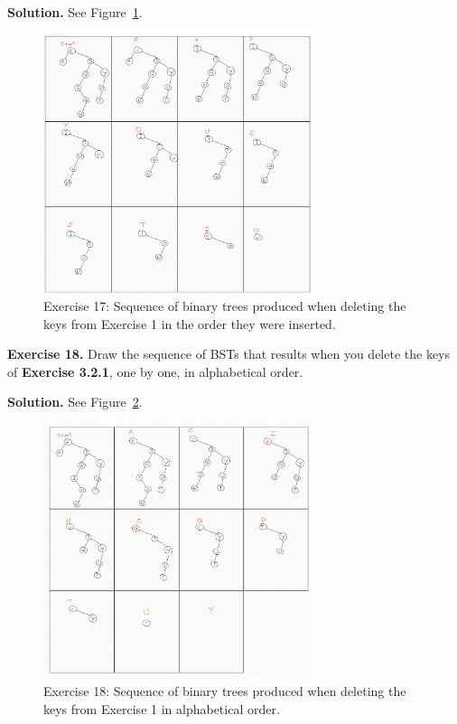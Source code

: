 \documentclass[12pt, a4paper]{article}
\newenvironment{ex}[2][Exercise]
{\par\medskip\noindent \textbf{#1 #2.}}
{\medskip}
\newenvironment{sol}[1][Solution]
{\par\medskip\noindent \textbf{#1.} }
{\medskip}
\begin{document}
	\begin{sol}
		See Figure~\ref{fig:ex-17}.
		\begin{figure}
			\centering
			\includegraphics[width=0.7\textwidth]{exercise-17}
			\caption{Exercise 17: Sequence of binary trees produced when deleting
			the keys from Exercise 1 in the order they were inserted.}
			\label{fig:ex-17}
		\end{figure}
	\end{sol}
	\begin{ex}{18}
		Draw the sequence of BSTs that results when you delete the keys of \textbf{Exercise 3.2.1},
		one by one, in alphabetical order.
	\end{ex}
	\begin{sol}
		See Figure~\ref{fig:ex-18}.
		\begin{figure}
			\centering
			\includegraphics[width=0.7\textwidth]{exercise-18}
			\caption{Exercise 18: Sequence of binary trees produced when deleting
				the keys from Exercise 1 in alphabetical order.}
			\label{fig:ex-18}
		\end{figure}
	\end{sol}
\end{document}
